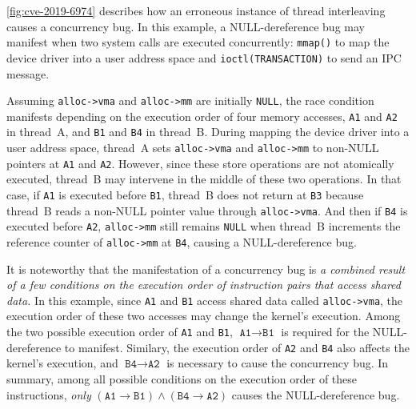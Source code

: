 \autoref{fig:cve-2019-6974} describes how an erroneous instance of
thread interleaving causes a concurrency bug.
%
In this example, a NULL-dereference bug may manifest when two system
calls are executed concurrently: \texttt{mmap()} to map the device
driver into a user address space and \texttt{ioctl(TRANSACTION)} to
send an IPC message.


Assuming \texttt{alloc->vma} and \texttt{alloc->mm} are initially
\texttt{NULL}, the race condition manifests depending on the execution
order of four memory accesses, \texttt{A1} and \texttt{A2} in
thread~A, and \texttt{B1} and \texttt{B4} in thread~B.
%
During mapping the device driver into a user address space, thread~A
sets \texttt{alloc->vma} and \texttt{alloc->mm} to non-NULL pointers
at \texttt{A1} and \texttt{A2}.
%
However, since these store operations are not atomically executed,
thread~B may intervene in the middle of these two operations.
%
In that case, if \texttt{A1} is executed before \texttt{B1}, thread~B
does not return at \texttt{B3} because thread~B reads a non-NULL
pointer value through \texttt{alloc->vma}.
%
And then if \texttt{B4} is executed before \texttt{A2},
\texttt{alloc->mm} still remains \texttt{NULL} when thread~B
increments the reference counter of \texttt{alloc->mm} at \texttt{B4},
causing a NULL-dereference bug.



It is noteworthy that the manifestation of a concurrency bug is
\textit{a combined result of a few conditions on the execution order
  of instruction pairs that access shared data.}
%
In this example, since \texttt{A1} and \texttt{B1} access shared data
called \texttt{alloc->vma}, the execution order of these two accesses
may change the kernel's execution. Among the two possible execution
order of \texttt{A1} and \texttt{B1},
$\texttt{A1} \rightarrow \texttt{B1}$ is required for the
NULL-dereference to manifest.
%
Similary, the execution order of \texttt{A2} and \texttt{B4} also
affects the kernel's execution, and
$\texttt{B4} \rightarrow \texttt{A2}$ is necessary to cause the
concurrency bug.
%
In summary, among all possible conditions on the execution order of
these instructions, \textit{only}
$(\texttt{A1} \rightarrow \texttt{B1}) \wedge (\texttt{B4} \rightarrow
\texttt{A2})$ causes the NULL-dereference bug.




